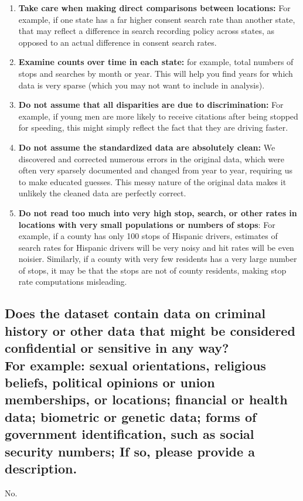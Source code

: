 \documentclass[letterpaper, 10 pt, conference]{ieeeconf}  %
\newcommand{\subtitle}[1]{{\\ \small \normalfont \color{purple} #1}}
\begin{document}
\begin{enumerate}
    \item \textbf{Take care when making direct comparisons between locations:} For example, if one state has a far higher consent search rate than another state, that may reflect a difference in search recording policy across states, as opposed to an actual difference in consent search rates.
    \item \textbf{Examine counts over time in each state:} for example, total numbers of stops and searches by month or year. This will help you find years for which data is very sparse (which you may not want to include in analysis).
    \item \textbf{Do not assume that all disparities are due to discrimination:} For example, if young men are more likely to receive citations after being stopped for speeding, this might simply reflect the fact that they are driving faster.
    \item \textbf{Do not assume the standardized data are absolutely clean:} We discovered and corrected numerous errors in the original data, which were often very sparsely documented and changed from year to year, requiring us to make educated guesses. This messy nature of the original data makes it unlikely the cleaned data are perfectly correct.
    \item \textbf{Do not read too much into very high stop, search, or other rates in locations with very small populations or numbers of stops}: For example, if a county has only 100 stops of Hispanic drivers, estimates of search rates for Hispanic drivers will be very noisy and hit rates will be even noisier. Similarly, if a county with very few residents has a very large number of stops, it may be that the stops are not of county residents, making stop rate computations misleading.
\end{enumerate}

\subsection{Does the dataset contain data on criminal history or other data that might be considered confidential or sensitive in any way? \subtitle{For example: sexual orientations, religious beliefs, political opinions or union memberships, or locations; financial or health data; biometric or genetic data; forms of government identification, such as social security numbers; If so, please provide a description.}}

No.
\end{document}
